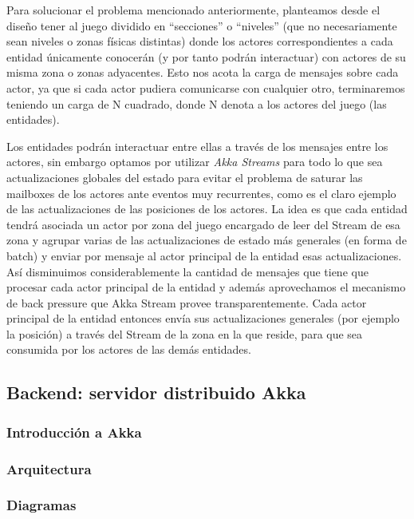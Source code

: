 Para solucionar el problema mencionado anteriormente, planteamos desde el diseño tener al juego 
dividido en “secciones” o “niveles” (que no necesariamente sean niveles o zonas físicas distintas) 
donde los actores correspondientes a cada entidad únicamente conocerán (y por tanto podrán interactuar) 
con actores de su misma zona o zonas adyacentes. Esto nos acota la carga de mensajes sobre cada actor, 
ya que si cada actor pudiera comunicarse con cualquier otro, terminaremos teniendo un carga de 
N cuadrado, donde N denota a los actores del juego (las entidades).

Los entidades podrán interactuar entre ellas a través de los mensajes entre los actores, 
sin embargo optamos por utilizar \textit{Akka Streams} para todo lo que sea actualizaciones globales 
del estado para evitar el problema de saturar las mailboxes de los actores ante eventos muy 
recurrentes, como es el claro ejemplo de las actualizaciones de las posiciones de los actores. 
La idea es que cada entidad tendrá asociada un actor por zona del juego encargado de leer del 
Stream de esa zona y agrupar varias de las actualizaciones de estado más generales (en forma de batch) 
y enviar por mensaje al actor principal de la entidad esas actualizaciones. 
Así disminuimos considerablemente la cantidad de mensajes que tiene que procesar cada actor 
principal de la entidad y además aprovechamos el mecanismo de back pressure que Akka Stream 
provee transparentemente. Cada actor principal de la entidad entonces envía sus actualizaciones 
generales (por ejemplo la posición) a través del Stream de la zona en la que reside, para que 
sea consumida por los actores de las demás entidades.



\subsection{Backend: servidor distribuido Akka}

\subsubsection{Introducción a Akka}

\subsubsection{Arquitectura}

\subsubsection{Diagramas}


